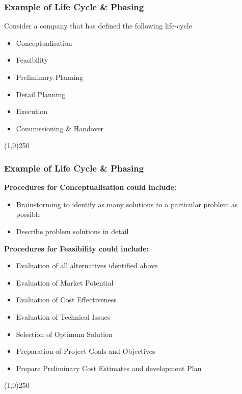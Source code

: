 \begin{frame}
\frametitle{Example of Life Cycle \& Phasing}
Consider a company that has defined the following life-cycle\\
\begin{itemize}
	\item Conceptualisation
	\item Feasibility
	\item Preliminary Planning
	\item Detail Planning
	\item Execution
	\item Commissioning \& Handover
\end{itemize}
\end{frame}
\begin{center}\line(1,0){250}\end{center}



\begin{frame}
\frametitle{Example of Life Cycle \& Phasing}
\textbf{Procedures for Conceptualisation could include:}\\
\begin{itemize}
	\item Brainstorming to identify as many solutions to a particular problem as possible
	\item Describe problem solutions in detail
\end{itemize}
\textbf{Procedures for Feasibility could include:}\\
\begin{itemize}
	\item Evaluation of all alternatives identified above
	\item Evaluation of Market Potential
	\item Evaluation of Cost Effectiveness
	\item Evaluation of Technical Issues
	\item Selection of Optimum Solution 
	\item Preparation of Project Goals and Objectives 
	\item Prepare Preliminary Cost Estimates and development Plan
\end{itemize}
\end{frame}
\begin{center}\line(1,0){250}\end{center}



